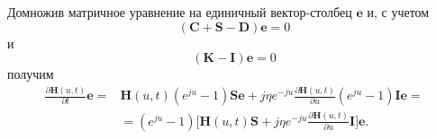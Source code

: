 Домножив матричное уравнение на единичный вектор-столбец $\boldsymbol{e}$ и,
с учетом $$(\boldsymbol{C} + \boldsymbol{S} - \boldsymbol{D}) \boldsymbol{e} = 0$$ 
и $$(\boldsymbol{K} - \boldsymbol{I}) \boldsymbol{e} = 0$$ получим
\begin{equation} \label{vtoroe__uravnenie}
\begin{aligned} 
    \frac{\partial \boldsymbol{H}(u,t)}{\partial t}\boldsymbol{e}=
        &\boldsymbol{H}(u,t)(e^{ju}-1)\boldsymbol{S}\boldsymbol{e}
            +j\eta e^{-ju}\frac{\partial \boldsymbol{H}(u,t)}{\partial u}(e^{ju}-1)\boldsymbol{I}\boldsymbol{e}=\\
        &=(e^{ju}-1)\Bigg[\boldsymbol{H}(u,t)\boldsymbol{S}
            +j\eta e^{-ju}\frac{\partial \boldsymbol{H}(u,t)}{\partial u}\boldsymbol{I} \Bigg]\boldsymbol{e}.
\end{aligned}
\end{equation}
\begin{comment}
Благодаря утверждению \eqref{summa_na_edinich_nol} можем преобразовать  \eqref{uravnenie_isaeva}:
\[\pdv{\boldsymbol{H}(u,t)}{t}\overline{\boldsymbol{E}}=\boldsymbol{H}(u,t)(e^{ju}-1)\]
\begin{align*}
\pdv{\boldsymbol{H}(u,t)}{t}\boldsymbol{e}=&\boldsymbol{H}(u,t)(e^{ju}-1)\boldsymbol{B}\boldsymbol{e}+j\sigma e^{-ju}\frac{\partial \boldsymbol{H}(u,t)}{\partial u}(e^{ju}-1)\boldsymbol{I_{0}}\boldsymbol{e}=\\
&=(e^{ju}-1)\{\boldsymbol{H}(u,t)\boldsymbol{B}\boldsymbol{e}+j\sigma e^{-ju}\frac{\partial \boldsymbol{H}(u,t)}{\partial u}\boldsymbol{I_{0}} \boldsymbol{e}\}
\end{align*} 
\end{comment}
